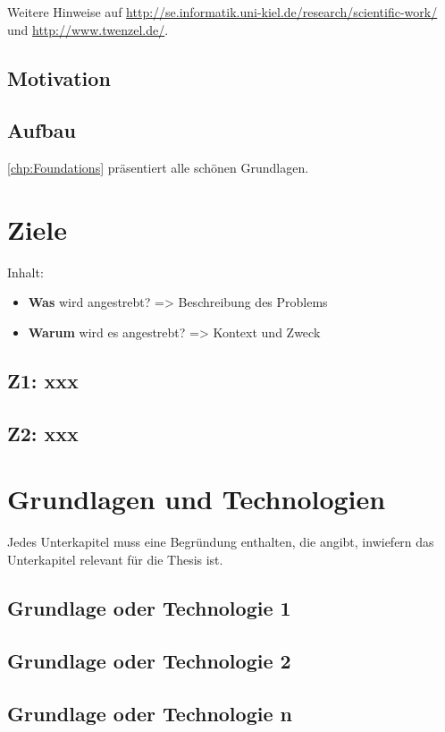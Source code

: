\documentclass[10pt]{book}
\begin{document}
  Weitere Hinweise auf \url{http://se.informatik.uni-kiel.de/research/scientific-work/} und \url{http://www.twenzel.de/}.

  \section{Motivation}
    \blindtext
  \section{Aufbau}
    \autoref{chp:Foundations} präsentiert alle schönen Grundlagen. 

\chapter{Ziele}\label{chp:Goals}
Inhalt:
\begin{itemize}
	\item \textbf{Was} wird angestrebt? => Beschreibung des Problems
	\item \textbf{Warum} wird es angestrebt? => Kontext und Zweck
\end{itemize}

\section{Z1: xxx}
\blindtext

\section{Z2: xxx}
\blindtext

\chapter{Grundlagen und Technologien}\label{chp:Foundations}

Jedes Unterkapitel muss eine Begründung enthalten, die angibt, inwiefern das Unterkapitel relevant für die Thesis ist.

  \section{Grundlage oder Technologie 1}
    \blindtext
  \section{Grundlage oder Technologie 2}
    \blindtext
  \section{Grundlage oder Technologie n}
    \blindtext
\end{document}
